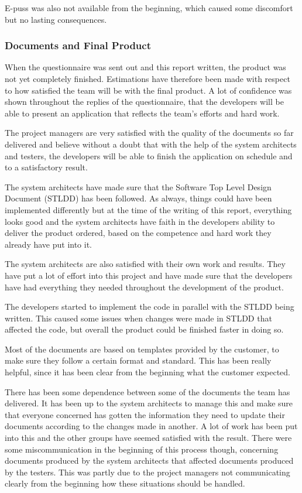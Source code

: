 \documentclass[a4paper]{article}
\begin{document}
E-puss was also not available from the beginning, which caused some discomfort but no lasting consequences.


\subsubsection{Documents and Final Product}
When the questionnaire was sent out and this report written, the product was not yet completely finished. Estimations have therefore been made with respect to how satisfied the team will be with the final product. A lot of confidence was shown throughout the replies of the questionnaire, that the developers will be able to present an application that reflects the team's efforts and hard work. 

The project managers are very satisfied with the quality of the documents so far delivered and believe without a doubt that with the help of the system architects and testers, the developers will be able to finish the application on schedule and to a satisfactory result.

The system architects have made sure that the Software Top Level Design Document (STLDD) has been followed. As always, things could have been implemented differently but at the time of the writing of this report, everything looks good and the system architects have faith in the developers ability to deliver the product ordered, based on the competence and hard work they already have put into it.  

The system architects are also satisfied with their own work and results. They have put a lot of effort into this project and have made sure that the developers have had everything they needed throughout the development of the product.

The developers started to implement the code in parallel with the STLDD being written. This caused some issues when changes were made in STLDD that affected the code, but overall the product could be finished faster in doing so. 

Most of the documents are based on templates provided by the customer, to make sure they follow a certain format and standard. This has been really helpful, since it has been clear from the beginning what the customer expected.

There has been some dependence between some of the documents the team has delivered. It has been up to the system architects to manage this and make sure that everyone concerned has gotten the information they need to update their documents according to the changes made in another. A lot of work has been put into this and the other groups have seemed satisfied with the result. There were some miscommunication in the beginning of this process though, concerning documents produced by the system architects that affected documents produced by the testers. This was partly due to the project managers not communicating clearly from the beginning how these situations should be handled. 
\end{document}
